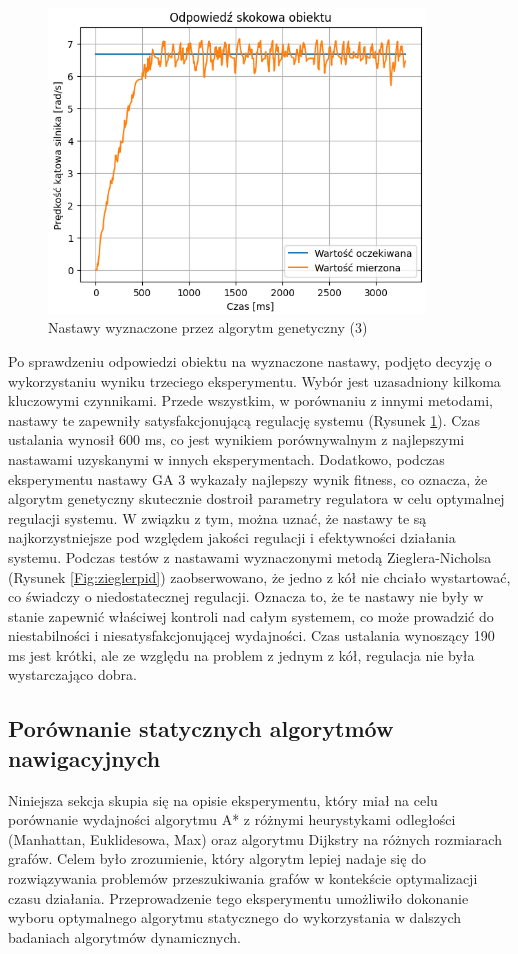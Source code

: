 \documentclass[12pt,twoside]{article}
\begin{document}
\begin{figure}[ht]%
 \centering%
 \includegraphics[width=10cm]{figures/PID/exp3pid.png}%
 \caption{Nastawy wyznaczone przez algorytm genetyczny (3)}%
 \label{Fig:exp3pid}%
\end{figure}

\clearpage

Po sprawdzeniu odpowiedzi obiektu na wyznaczone nastawy, podjęto decyzję o wykorzystaniu wyniku trzeciego eksperymentu. Wybór jest uzasadniony kilkoma kluczowymi czynnikami. Przede wszystkim, w porównaniu z innymi metodami, nastawy te zapewniły satysfakcjonującą regulację systemu (Rysunek \ref{Fig:exp3pid}). Czas ustalania wynosił 600 ms, co jest wynikiem porównywalnym z najlepszymi nastawami uzyskanymi w innych eksperymentach. Dodatkowo, podczas eksperymentu nastawy GA 3 wykazały najlepszy wynik fitness, co oznacza, że algorytm genetyczny skutecznie dostroił parametry regulatora w celu optymalnej regulacji systemu. W związku z tym, można uznać, że nastawy te są najkorzystniejsze pod względem jakości regulacji i efektywności działania systemu. Podczas testów z nastawami wyznaczonymi metodą Zieglera-Nicholsa (Rysunek \ref{Fig:zieglerpid}) zaobserwowano, że jedno z kół nie chciało wystartować, co świadczy o niedostatecznej regulacji. Oznacza to, że te nastawy nie były w stanie zapewnić właściwej kontroli nad całym systemem, co może prowadzić do niestabilności i niesatysfakcjonującej wydajności. Czas ustalania wynoszący 190 ms jest krótki, ale ze względu na problem z jednym z kół, regulacja nie była wystarczająco dobra.



\subsection{Porównanie statycznych algorytmów nawigacyjnych}
Niniejsza sekcja skupia się na opisie eksperymentu, który miał na celu porównanie wydajności algorytmu A* z różnymi heurystykami odległości (Manhattan, Euklidesowa, Max) oraz algorytmu Dijkstry na różnych rozmiarach grafów. Celem było zrozumienie, który algorytm lepiej nadaje się do rozwiązywania problemów przeszukiwania grafów w kontekście optymalizacji czasu działania. Przeprowadzenie tego eksperymentu umożliwiło dokonanie wyboru optymalnego algorytmu statycznego do wykorzystania w dalszych badaniach algorytmów dynamicznych.
\end{document}

